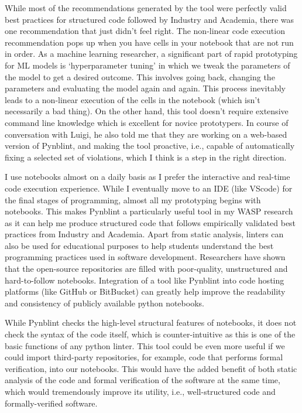 \documentclass[11pt]{article}
\begin{document}
\par{While most of the recommendations generated by the tool were perfectly valid best practices for structured code followed by Industry and Academia, there was one recommendation that just didn’t feel right. The non-linear code execution recommendation pops up when you have cells in your notebook that are not run in order. As a machine learning researcher, a significant part of rapid prototyping for ML models is ‘hyperparameter tuning’ in which we tweak the parameters of the model to get a desired outcome. This involves going back, changing the parameters and evaluating the model again and again. This process inevitably leads to a non-linear execution of the cells in the notebook (which isn’t necessarily a bad thing). On the other hand, this tool doesn’t require extensive command line knowledge which is excellent for novice prototypers. In course of conversation with Luigi, he also told me that they are working on a web-based version of Pynblint, and making the tool proactive, i.e., capable of automatically fixing a selected set of violations, which I think is a step in the right direction.} 
\\
\par{I use notebooks almost on a daily basis as I prefer the interactive and real-time code execution experience. While I eventually move to an IDE (like VScode) for the final stages of programming, almost all my prototyping begins with notebooks. This makes Pynblint a particularly useful tool in my WASP research as it can help me produce structured code that follows empirically validated best practices from Industry and Academia. Apart from static analysis, linters can also be used for educational purposes to help students understand the best programming practices used in software development. Researchers have shown that the open-source repositories are filled with poor-quality, unstructured and hard-to-follow notebooks. Integration of a tool like Pynblint into code hosting platforms (like GitHub or BitBucket) can greatly help improve the readability and consistency of publicly available python notebooks.}
\\
\par{While Pynblint checks the high-level structural features of notebooks, it does not check the syntax of the code itself, which is counter-intuitive as this is one of the basic functions of any python linter. This tool could be even more useful if we could import third-party repositories, for example, code that performs formal verification, into our notebooks. This would have the added benefit of both static analysis of the code and formal verification of the software at the same time, which would tremendously improve its utility, i.e., well-structured code and formally-verified software.}
\\
\end{document}
